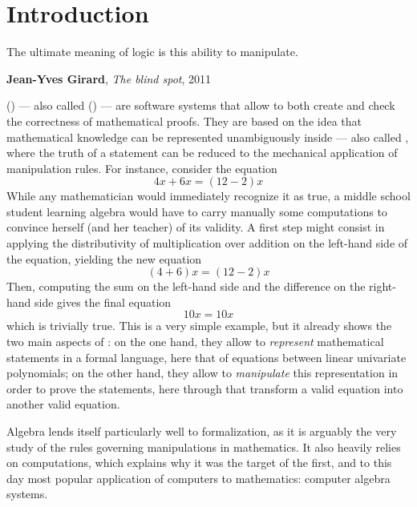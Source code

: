 \setchapterpreamble[u]{\margintoc}
\chapter{Introduction}

\epigraph{The ultimate meaning of logic is this ability to manipulate.}
{\textbf{Jean-Yves Girard}, \textit{The blind spot}, 2011}


\AP {} () --- also called
 () --- are software systems
that allow to both create and check the correctness of mathematical proofs. They
are based on the idea that mathematical knowledge can be represented
unambiguously inside  --- also called , where the truth of a statement can be reduced to the mechanical
application of  manipulation rules. For instance, consider the
equation
$$4x + 6x = (12 - 2)x$$ 
While any mathematician would immediately recognize it as true, a middle school
student learning algebra would have to carry manually some computations to
convince herself (and her teacher) of its validity. A first step might consist
in applying the distributivity of multiplication over addition on the left-hand
side of the equation, yielding the new equation
$$(4 + 6)x = (12 - 2)x$$
Then, computing the sum on the left-hand side and the difference on the
right-hand side gives the final equation
$$10x = 10x$$
\AP which is trivially true. This is a very simple example, but it already shows
the two main aspects of : on the one hand, they allow to
\emph{represent} mathematical statements in a formal language, here that of
equations between linear univariate polynomials; on the other hand, they allow
to \emph{manipulate} this representation in order to prove the statements, here
through  that transform a valid equation into another
valid equation.

Algebra lends itself particularly well to formalization, as it is arguably the
very study of the rules governing  manipulations in mathematics. It also
heavily relies on computations, which explains why it was the target of the
first, and to this day most popular application of computers to mathematics:
computer algebra systems.

